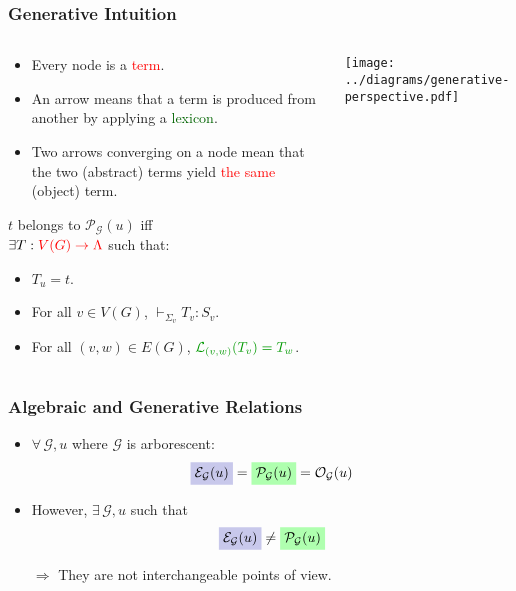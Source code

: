 \documentclass{beamer}
\newcommand{\highlight}[2]{\colorbox{#1}{$\displaystyle #2$}}
\begin{document}
\begin{frame}
  \frametitle{Generative Intuition}

  \begin{columns}[c]
    \begin{column}{0.7\textwidth}
      \begin{block}{}
        \begin{itemize}
        \item Every node is a \textcolor{red}{term}.
        \item An arrow means that a term is produced from another by
          applying a \textcolor{darkgreen}{lexicon}.
        \item Two arrows converging on a node mean that the two (abstract)
          terms yield \textcolor{red}{the same} (object) term.
        \end{itemize}
      \end{block}

      \vspace{3 mm}

      $t$ belongs to $\mathcal{P}_{\mathcal{G}}(u)$ iff \\$\exists T :
      \textcolor{red}{V(G) \to \Lambda}$ such that:
      \begin{itemize}
      \item $T_u = t$.
      \item For all $v \in V(G)$, $\vdash_{\Sigma_v} T_v : S_v$.
      \item For all $(v,w) \in E(G)$,
        $\textcolor{darkgreen}{\mathcal{L}_{(v,w)}(T_v) = T_w}$.
      \end{itemize}
    \end{column}
    \begin{column}{0.3\textwidth}
      \texttt{[image: ../diagrams/generative-perspective.pdf]}
    \end{column}
  \end{columns}
\end{frame}


\begin{frame}
  \frametitle{Algebraic and Generative Relations}

  \begin{itemize}
  \item $\forall \, \mathcal{G}, u$ where $\mathcal{G}$ is arborescent:
    $$\highlight{limeblue}{\mathcal{E}_{\mathcal{G}}(u)}
    = \highlight{limegreen}{\mathcal{P}_{\mathcal{G}}(u)}
    = \mathcal{O}_{\mathcal{G}}(u)$$
    \pause
  \item However, $\exists \, \mathcal{G}, u$ such that
    $$\highlight{limeblue}{\mathcal{E}_{\mathcal{G}}(u)}
       \neq \highlight{limegreen}{\mathcal{P}_{\mathcal{G}}(u)}$$
    \vfill
    \pause
  \item[$\Rightarrow$] They are not interchangeable points of view.
  \end{itemize}
\end{frame}
\end{document}
